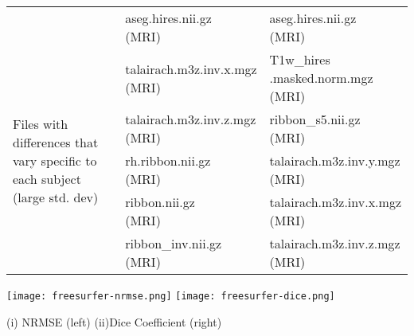 \begin{center}
\begin{longtable}{|p{}|p{}|p{}|}
& \makecell[l]{aseg.hires.nii.gz\\(MRI)}  & \makecell[l]{aseg.hires.nii.gz\\(MRI)} \\\cline{1-3}
\multirow{5}{.3\textwidth}{Files with differences that vary specific to each subject (large std. dev)}   & \makecell[l]{talairach.m3z.inv.x.mgz\\(MRI)}  & \makecell[l]{T1w\_hires\\.masked.norm.mgz\\(MRI)} \\\cline{2-3}
& \makecell[l]{talairach.m3z.inv.z.mgz\\(MRI)}                 & \makecell[l]{ribbon\_s5.nii.gz\\(MRI)} \\\cline{2-3}
& \makecell[l]{rh.ribbon.nii.gz\\(MRI)}                                                            & \makecell[l]{talairach.m3z.inv.y.mgz\\(MRI)} \\\cline{2-3}
& \makecell[l]{ribbon.nii.gz\\(MRI)}                   & \makecell[l]{talairach.m3z.inv.x.mgz\\(MRI)} \\\cline{2-3}
& \makecell[l]{ribbon\_inv.nii.gz\\(MRI)}                                                   & \makecell[l]{talairach.m3z.inv.z.mgz\\(MRI)} \\\cline{1-3}
\end{longtable}
\label{tab:FreeSurfer_comparison_table}
\end{center}
\hfill \break

\begin{center}
\texttt{[image: freesurfer-nrmse.png]}%
\texttt{[image: freesurfer-dice.png]}
\caption*{(i) NRMSE (left) (ii)Dice Coefficient (right)}
\label{fig:freesurfer_metric_values}
\end{center}

